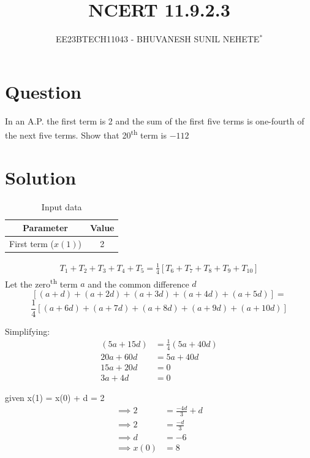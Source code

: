 \documentclass[journal,12pt,twocolumn]{IEEEtran}
\theoremstyle{remark}
\begin{document}

\vspace{3cm}

\title{NCERT 11.9.2.3}
\author{EE23BTECH11043 - BHUVANESH SUNIL NEHETE$^{*}$%
}
\maketitle
\newpage
\bigskip

\renewcommand{\thefigure}{\theenumi}
\renewcommand{\thetable}{\theenumi}



\section*{Question}

In an A.P. the first term is 2 and the sum of the first five terms is one-fourth of the next five terms. Show that 20\textsuperscript{th} term is $-112$

\section*{Solution}
\begin{table}[h]
  \centering
  \begin{tabular}{|c|c|}
    \hline
    \textbf{Parameter} & \textbf{Value} \\
    \hline
    First term (\(x(1)\)) & 2 \\
    \hline
  \end{tabular}
  \caption{Input data}
  \label{Table 1}
\end{table}
   \begin{align}
    T_1 + T_2 + T_3 + T_4 + T_5 = \frac{1}{4} [T_6 + T_7 + T_8 + T_9 + T_{10}]
    \end{align}
Let the zero\textsuperscript{th} term \(a\) and the common difference \(d\)
\[[(a + d) + (a + 2d) + (a + 3d) + (a + 4d) + (a + 5d)] =\] 
\[\frac{1}{4} [(a + 6d) + (a + 7d) + (a + 8d) + (a + 9d) + (a + 10d)]\]


Simplifying:
    \begin{align}
    (5a + 15d) &= \frac{1}{4}(5a + 40d)\\
    20a + 60d &= 5a + 40d\\
    15a + 20d &= 0\\
    3a + 4d &= 0 
    \end{align}

    given x(1) = x(0) + d = 2
    \begin{align}
        \implies 2 &= \frac{-4d}{3} +d\\
        \implies 2 &= \frac{-d}{3}\\
        \implies d &= -6\\
        \implies x(0) &= 8
    \end{align}
\end{document}
